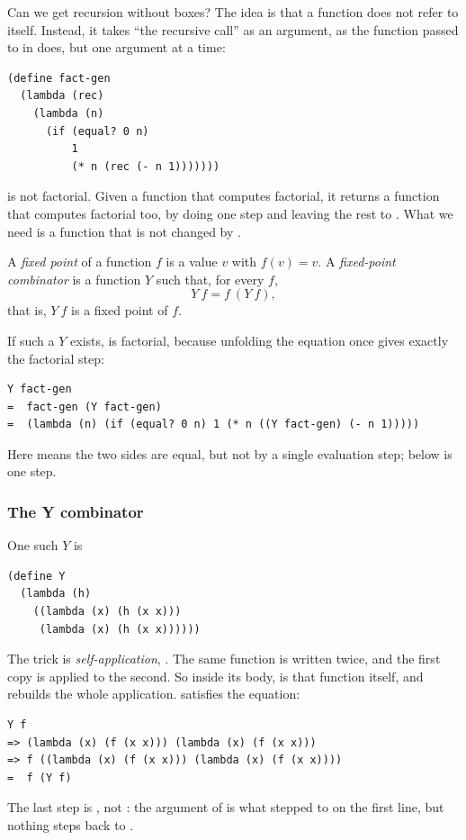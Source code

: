 Can we get recursion without boxes? The idea is that a function does not refer to itself. Instead, it takes ``the recursive call'' as an argument, as the function passed to  in  does, but one argument at a time:
\begin{lstlisting}
(define fact-gen
  (lambda (rec)
    (lambda (n)
      (if (equal? 0 n)
          1
          (* n (rec (- n 1)))))))
\end{lstlisting}
 is not factorial. Given a function  that computes factorial, it returns a function that computes factorial too, by doing one step and leaving the rest to . What we need is a function that is not changed by .

\begin{definition}
A \emph{fixed point} of a function $f$ is a value $v$ with $f(v) = v$. A \emph{fixed-point combinator} is a function $Y$ such that, for every $f$,
\[
Y\ f = f\ (Y\ f),
\]
that is, $Y\ f$ is a fixed point of $f$.
\end{definition}
If such a $Y$ exists,  is factorial, because unfolding the equation once gives exactly the factorial step:
\begin{lstlisting}[style=repl]
Y fact-gen
=  fact-gen (Y fact-gen)
=  (lambda (n) (if (equal? 0 n) 1 (* n ((Y fact-gen) (- n 1)))))
\end{lstlisting}
Here \code{=} means the two sides are equal, but not by a single evaluation step; \code{=>} below is one step.

\subsubsection{The Y combinator} One such $Y$ is
\begin{lstlisting}
(define Y
  (lambda (h)
    ((lambda (x) (h (x x)))
     (lambda (x) (h (x x))))))
\end{lstlisting}
The trick is \emph{self-application}, . The same function is written twice, and the first copy is applied to the second. So inside its body,  is that function itself, and  rebuilds the whole application.  satisfies the equation:
\begin{lstlisting}[style=repl]
Y f
=> (lambda (x) (f (x x))) (lambda (x) (f (x x)))
=> f ((lambda (x) (f (x x))) (lambda (x) (f (x x))))
=  f (Y f)
\end{lstlisting}
The last step is \code{=}, not \code{=>}: the argument of  is what  stepped to on the first line, but nothing steps back to .

